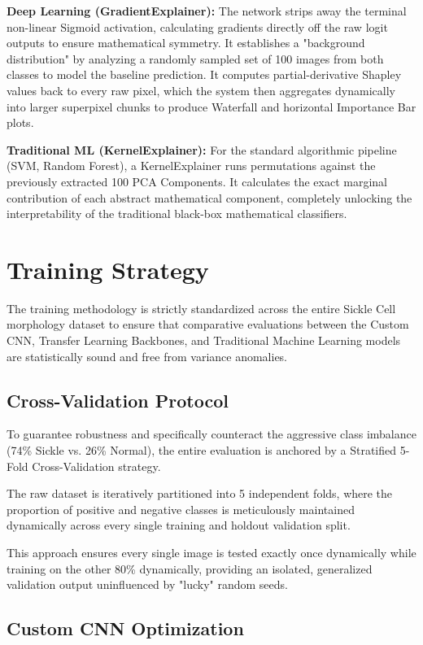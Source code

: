 \noindent\textbf{Deep Learning (GradientExplainer):} The network strips away the terminal non-linear Sigmoid activation, calculating gradients directly off the raw logit outputs to ensure mathematical symmetry. It establishes a "background distribution" by analyzing a randomly sampled set of 100 images from both classes to model the baseline prediction. It computes partial-derivative Shapley values back to every raw pixel, which the system then aggregates dynamically into larger superpixel chunks to produce Waterfall and horizontal Importance Bar plots.

\noindent\textbf{Traditional ML (KernelExplainer):} For the standard algorithmic pipeline (SVM, Random Forest), a KernelExplainer runs permutations against the previously extracted 100 PCA Components. It calculates the exact marginal contribution of each abstract mathematical component, completely unlocking the interpretability of the traditional black-box mathematical classifiers.

\section{Training Strategy}

The training methodology is strictly standardized across the entire Sickle Cell morphology dataset to ensure that comparative evaluations between the Custom CNN, Transfer Learning Backbones, and Traditional Machine Learning models are statistically sound and free from variance anomalies.

\subsection{Cross-Validation Protocol}

To guarantee robustness and specifically counteract the aggressive class imbalance (74\% Sickle vs. 26\% Normal), the entire evaluation is anchored by a Stratified 5-Fold Cross-Validation strategy.

The raw dataset is iteratively partitioned into 5 independent folds, where the proportion of positive and negative classes is meticulously maintained dynamically across every single training and holdout validation split.

This approach ensures every single image is tested exactly once dynamically while training on the other 80\% dynamically, providing an isolated, generalized validation output uninfluenced by "lucky" random seeds.

\subsection{Custom CNN Optimization}

